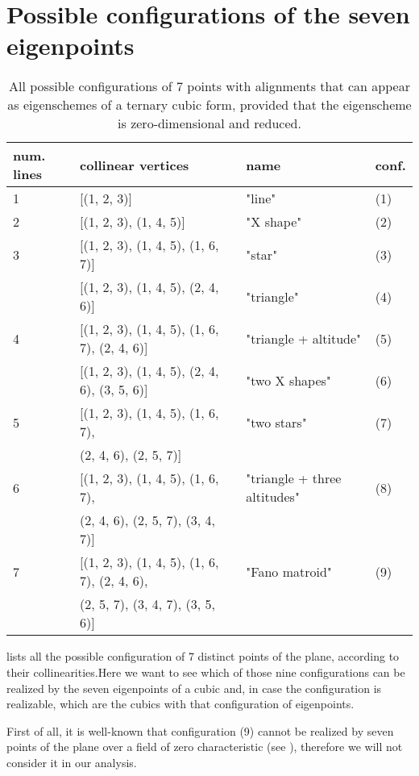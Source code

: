 \documentclass{amsart}
\theoremstyle{plain}
\theoremstyle{definition}
\begin{document}
\section{Possible configurations of the seven eigenpoints}
\label{further_alignments}

\begin{table}
\caption{All possible configurations of $7$ points with alignments that can appear as eigenschemes of a ternary cubic form, provided that the eigenscheme is zero-dimensional and reduced.}
\centering
\begin{tabular}{|llll|}\hline
  num. lines  & collinear vertices & name & conf.\\ \hline
 1& [(1, 2, 3)] & "line" & (1)\\
 2& [(1, 2, 3), (1, 4, 5)] & "X shape"& (2)\\
 3& [(1, 2, 3), (1, 4, 5), (1, 6, 7)] & "star" & (3)\\
  & [(1, 2, 3), (1, 4, 5), (2, 4, 6)] & "triangle" & (4)\\
 4& [(1, 2, 3), (1, 4, 5), (1, 6, 7), (2, 4, 6)] & "triangle + altitude" & (5)\\
  & [(1, 2, 3), (1, 4, 5), (2, 4, 6), (3, 5, 6)] & "two X shapes" & (6)\\
 5& [(1, 2, 3), (1, 4, 5), (1, 6, 7),  & "two stars" & (7)\\
  & \phantom{[}(2, 4, 6), (2, 5, 7)] & &\\
 6& [(1, 2, 3), (1, 4, 5), (1, 6, 7), & "triangle + three altitudes" & (8)\\
  & \phantom{[} (2, 4, 6), (2, 5, 7), (3, 4, 7)] & & \\
 7& [(1, 2, 3),
   (1, 4, 5),
   (1, 6, 7),
   (2, 4, 6), & "Fano matroid" & (9)\\
  & \phantom{[} (2, 5, 7),
   (3, 4, 7),
   (3, 5, 6)] & & \\ \hline
\end{tabular}
\label{table:all_alignments}
\end{table}

 lists all the possible configuration
of 7 distinct points of the plane, according to their collinearities.Here
we want to see which of those nine configurations can be realized by
the seven eigenpoints of a cubic and, in case the configuration is
realizable, which are the cubics with that configuration of eigenpoints.

First of all, it is well-known that configuration (9) cannot be realized
by seven points of the plane over a field of zero
characteristic (see \cite{Whitney1935}), therefore we will not consider
it in our analysis.
\end{document}
